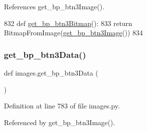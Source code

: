 References get\+\_\+bp\+\_\+btn3\+Image().


\begin{DoxyCode}
832 \textcolor{keyword}{def }\hyperlink{namespaceimages_a4f4cb6eb620070ef37c962ae6c43c418}{get\_bp\_btn3Bitmap}():
833     \textcolor{keywordflow}{return} BitmapFromImage(\hyperlink{namespaceimages_a4a775bb497640194045625f016d30596}{get\_bp\_btn3Image}())
834 
\end{DoxyCode}
\mbox{\label{namespaceimages_ab1f0d8c363fbca669998deb88699c3d6}} 
\subsubsection{\texorpdfstring{get\+\_\+bp\+\_\+btn3\+Data()}{get\_bp\_btn3Data()}}
{\footnotesize\ttfamily def images.\+get\+\_\+bp\+\_\+btn3\+Data (\begin{DoxyParamCaption}{ }\end{DoxyParamCaption})}



Definition at line 783 of file images.\+py.



Referenced by get\+\_\+bp\+\_\+btn3\+Image().


